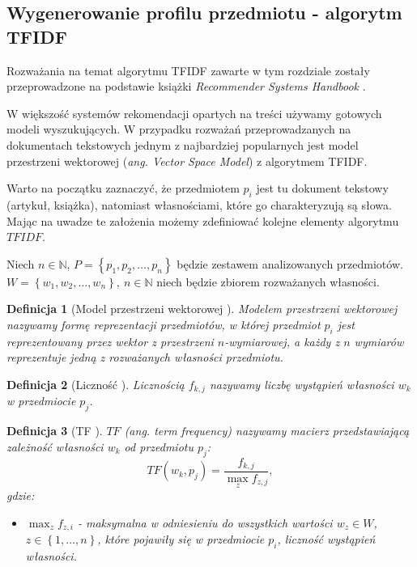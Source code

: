 \documentclass[12pt,a4paper]{report}
\newtheorem{df}{Definicja}[chapter]
\newcommand{\set}[1]{\left\lbrace {#1} \right\rbrace}
\newcommand{\setN}{\mathbb{N}}
\newcommand{\setPrzedmioty}{\mathit{P}}
\newcommand{\setWlasnosci}{\mathit{W}}
\begin{document}
\subsection{Wygenerowanie profilu przedmiotu - algorytm TFIDF}
Rozważania na temat algorytmu TFIDF zawarte w tym rozdziale zostały przeprowadzone na podstawie książki \textit{Recommender Systems Handbook} {\citep[Sec 3.3.1.1]{rsh}}.
\bigskip
\bigskip

W większość systemów rekomendacji opartych na treści używamy gotowych modeli wyszukujących. W przypadku rozważań przeprowadzanych na dokumentach tekstowych jednym z najbardziej popularnych jest model przestrzeni wektorowej (\textit{ang. Vector Space Model}) z algorytmem TFIDF. 

Warto na początku zaznaczyć, że przedmiotem $p_i$ jest tu dokument tekstowy (artykuł, książka), natomiast własnościami, które go charakteryzują są słowa. Mając na uwadze te założenia możemy zdefiniować kolejne elementy algorytmu $TFIDF$.
\bigskip

Niech $n\in \setN$, $\setPrzedmioty = \set{p_1, p_2, \ldots ,p_n}$ będzie zestawem analizowanych przedmiotów. $W = \set{w_1, w_2, \ldots ,w_n}, \: n\in \setN $ niech będzie zbiorem rozważanych własności.

\begin{df}[Model przestrzeni wektorowej {\citep[Sec 3.3.1.1]{rsh}}]
Modelem przestrzeni wektorowej nazywamy formę reprezentacji przedmiotów, w której przedmiot $p_i$ jest reprezentowany przez wektor z przestrzeni $n$-wymiarowej, a każdy z $n$ wymiarów reprezentuje jedną z rozważanych własności przedmiotu. 
\end{df}

\begin{df}[Liczność {\citep[Sec 3.3.1.1]{rsh}}]
Licznością $f_{k,j}$ nazywamy liczbę wystąpień własności $w_k$ w przedmiocie $p_j$.
\end{df}

\begin{df}[TF {\citep[Sec 3.3.1.1]{rsh}}]
$TF$ (ang. \textit{term frequency}) nazywamy macierz przedstawiającą zależność własności $w_k$ od przedmiotu $p_j$:
$$
TF(w_k, p_j)=\frac{f_{k,j}}{\max_{z}f_{z,j}},
$$
gdzie:
\begin{itemize}
\item $\max_{z}f_{z,i}$ - maksymalna w odniesieniu do wszystkich wartości $w_z \in \setWlasnosci$, $z \in \set{1, \ldots, n}$, które pojawiły się w przedmiocie $p_i$, liczność wystąpień własności. 
\end{itemize}
\end{df}
\end{document}
